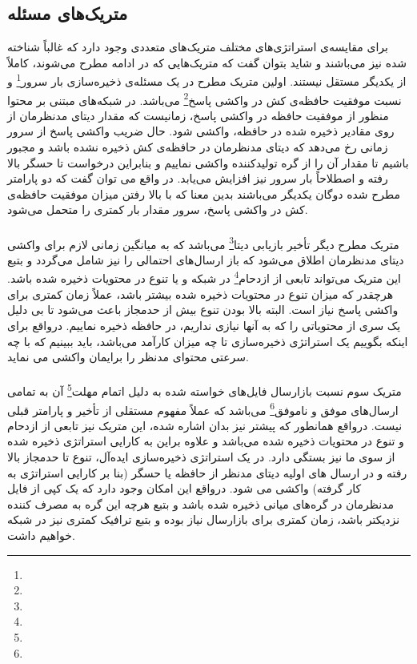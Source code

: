 \subsection{متریک‌های مسئله}
برای مقایسه‌ی استراتژی‌های مختلف متریک‌های متعددی وجود دارد که غالباً شناخته شده نیز می‌باشند و شاید بتوان گفت که متریک‌هایی که در ادامه مطرح می‌شوند، کاملاً از یکدیگر مستقل نیستند. اولین متریک مطرح در یک مسئله‌ی ذخیره‌سازی بار سرور\footnote{} و نسبت موفقیت حافظه‌ی کش در واکشی پاسخ\footnote{} می‌باشد. در شبکه‌های مبتنی بر محتوا منظور از موفقیت حافظه در واکشی پاسخ، زمانیست که مقدار دیتای مدنظرمان از روی مقادیر ذخیره شده در حافظه، واکشی شود. حال ضریب واکشی پاسخ از سرور زمانی رخ می‌دهد که دیتای مدنظرمان در حافظه‌ی کش ذخیره نشده باشد و مجبور باشیم تا مقدار آن را از گره تولیدکننده واکشی نماییم و بنابراین درخواست تا حسگر بالا رفته و اصطلاحاً بار سرور نیز افزایش می‌یابد. در واقع می توان گفت که دو پارامتر مطرح شده دوگان یکدیگر می‌باشند بدین معنا که با بالا رفتن میزان موفقیت حافظه‌ی کش در واکشی پاسخ، سرور مقدار بار کمتری را متحمل می‌شود.

\paragraph{}
متریک مطرح دیگر تأخیر بازیابی دیتا\footnote{} می‌باشد که به میانگین زمانی لازم برای واکشی دیتای مدنظرمان اطلاق می‌شود که باز ارسال‌های احتمالی را نیز شامل می‌گردد و بتبع این متریک می‌تواند تابعی از ازدحام\footnote{} در شبکه و یا تنوع در محتویات ذخیره شده باشد. هرچقدر که میزان تنوع در محتویات ذخیره شده بیشتر باشد، عملاً زمان کمتری برای واکشی پاسخ نیاز است. البته بالا بودن تنوع بیش از حدمجاز باعث می‌شود تا بی دلیل یک سری از محتویاتی را که به آنها نیازی نداریم، در حافظه ذخیره نماییم. درواقع برای اینکه بگوییم یک استراتژی ذخیره‌سازی تا چه میزان کارآمد می‌باشد، باید ببینیم که با چه سرعتی محتوای مدنظر را برایمان واکشی می نماید.  

\paragraph{}
متریک سوم نسبت بازارسال فایل‌های خواسته شده به دلیل اتمام مهلت\footnote{} آن به تمامی ارسال‌های موفق و ناموفق\footnote{} می‌باشد که عملاً مفهوم مستقلی از تأخیر و پارامتر قبلی نیست. درواقع همانطور که پیشتر نیز بدان اشاره شده، این متریک نیز تابعی از ازدحام و تنوع در محتویات ذخیره شده می‌باشد و علاوه براین به کارایی استراتژی ذخیره شده از سوی ما نیز بستگی دارد. در یک استراتژی ذخیره‌سازی ایده‌آل، تنوع تا حدمجاز بالا رفته و در ارسال های اولیه دیتای مدنظر از حافظه یا حسگر (بنا بر کارایی استراتژی به کار گرفته) واکشی می شود. درواقع این امکان وجود دارد که یک کپی از فایل مدنظرمان در گره‌های میانی ذخیره شده باشد و بتبع هرچه این گره به مصرف کننده نزدیکتر باشد، زمان کمتری برای بازارسال نیاز بوده و بتبع ترافیک کمتری نیز در شبکه خواهیم داشت. 

